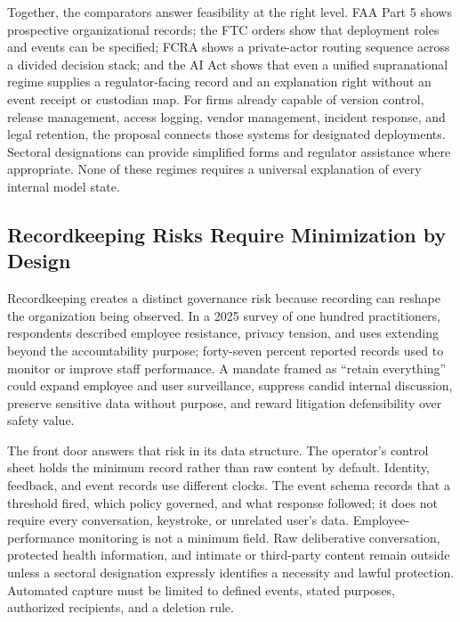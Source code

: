 Together, the comparators answer feasibility at the right level. FAA Part 5 shows prospective organizational records; the FTC orders show that deployment roles and events can be specified; FCRA shows a private-actor routing sequence across a divided decision stack; and the AI Act shows that even a unified supranational regime supplies a regulator-facing record and an explanation right without an event receipt or custodian map. For firms already capable of version control, release management, access logging, vendor management, incident response, and legal retention, the proposal connects those systems for designated deployments. Sectoral designations can provide simplified forms and regulator assistance where appropriate. None of these regimes requires a universal explanation of every internal model state.

\subsection{Recordkeeping Risks Require Minimization by Design}

Recordkeeping creates a distinct governance risk because recording can reshape the organization being observed. In a 2025 survey of one hundred practitioners, respondents described employee resistance, privacy tension, and uses extending beyond the accountability purpose; forty-seven percent reported records used to monitor or improve staff performance. A mandate framed as ``retain everything'' could expand employee and user surveillance, suppress candid internal discussion, preserve sensitive data without purpose, and reward litigation defensibility over safety value.

The front door answers that risk in its data structure. The operator's control sheet holds the minimum record rather than raw content by default. Identity, feedback, and event records use different clocks. The event schema records that a threshold fired, which policy governed, and what response followed; it does not require every conversation, keystroke, or unrelated user's data. Employee-performance monitoring is not a minimum field. Raw deliberative conversation, protected health information, and intimate or third-party content remain outside unless a sectoral designation expressly identifies a necessity and lawful protection. Automated capture must be limited to defined events, stated purposes, authorized recipients, and a deletion rule.

